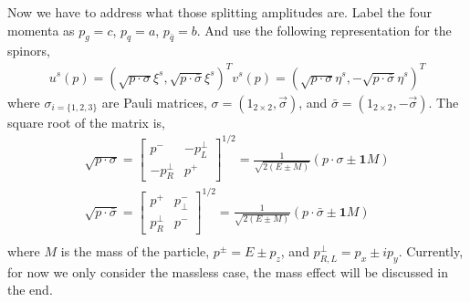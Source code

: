 Now we have to address what those splitting amplitudes are.
Label the four momenta as $p_g = c$, $p_q = a$, $p_{\bar{q}} = b$.
And use the following representation for the spinors,
\begin{eqnarray}
u^s(p) = (\sqrt{p\cdot \sigma} \xi^s, \sqrt{p\cdot \bar{\sigma}} \xi^s)^T
v^s(p) = (\sqrt{p\cdot \sigma} \eta^s, -\sqrt{p\cdot \bar{\sigma}} \eta^s)^T
\end{eqnarray}
where $\sigma_{i=\{1,2,3\}}$ are Pauli matrices, $\sigma = (1_{2\times 2}, \vec{\sigma})$, and $\bar{\sigma} = (1_{2\times 2}, -\vec{\sigma})$.
The square root of the matrix is,
\begin{eqnarray}
\sqrt{p\cdot \sigma} =
\left.
\begin{bmatrix}
p^- & -p_L^\perp \\
-p_R^\perp & p^+
\end{bmatrix}\right.^{1/2} 
= \frac{1}{\sqrt{2(E\pm M)}}(p\cdot\sigma \pm \mathbf{1}M)\\
\sqrt{p\cdot \bar{\sigma}} =
\left.
\begin{bmatrix}
p^+ & p_\perp^- \\
p_R^\perp & p^-
\end{bmatrix}\right.^{1/2} 
= \frac{1}{\sqrt{2(E\pm M)}}(p\cdot\bar{\sigma} \pm \mathbf{1}M)\\
\end{eqnarray}
where $M$ is the mass of the particle, $p^\pm = E\pm p_z$, and $p_{R,L}^\perp = p_x \pm  i p_y$.
Currently, for now we only consider the massless case, the mass effect will be discussed in the end.

